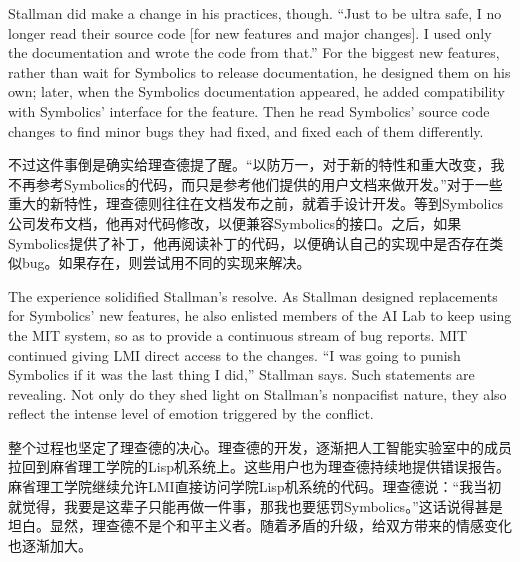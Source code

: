 \ifdefined\eng
Stallman did make a change in his practices, though.  ``Just to be ultra safe, I no longer read their source code [for new features and major changes]. I used only the documentation and wrote the code from that.''  For the biggest new features, rather than wait for Symbolics to release documentation, he designed them on his own; later, when the Symbolics documentation appeared, he added compatibility with Symbolics' interface for the feature.  Then he read Symbolics' source code changes to find minor bugs they had fixed, and fixed each of them differently.
\fi

\ifdefined\chs
不过这件事倒是确实给理查德提了醒。“以防万一，对于新的特性和重大改变，我不再参考Symbolics的代码，而只是参考他们提供的用户文档来做开发。”对于一些重大的新特性，理查德则往往在文档发布之前，就着手设计开发。等到Symbolics公司发布文档，他再对代码修改，以便兼容Symbolics的接口。之后，如果Symbolics提供了补丁，他再阅读补丁的代码，以便确认自己的实现中是否存在类似bug。如果存在，则尝试用不同的实现来解决。
\fi

\ifdefined\eng
The experience solidified Stallman's resolve. As Stallman designed replacements for Symbolics' new features, he also enlisted members of the AI Lab to keep using the MIT system, so as to provide a continuous stream of bug reports. MIT continued giving LMI direct access to the changes. ``I was going to punish Symbolics if it was the last thing I did,'' Stallman says.  Such statements are revealing. Not only do they shed light on Stallman's nonpacifist nature, they also reflect the intense level of emotion triggered by the conflict.
\fi

\ifdefined\chs
整个过程也坚定了理查德的决心。理查德的开发，逐渐把人工智能实验室中的成员拉回到麻省理工学院的Lisp机系统上。这些用户也为理查德持续地提供错误报告。麻省理工学院继续允许LMI直接访问学院Lisp机系统的代码。理查德说：“我当初就觉得，我要是这辈子只能再做一件事，那我也要惩罚Symbolics。”这话说得甚是坦白。显然，理查德不是个和平主义者。随着矛盾的升级，给双方带来的情感变化也逐渐加大。
\fi

